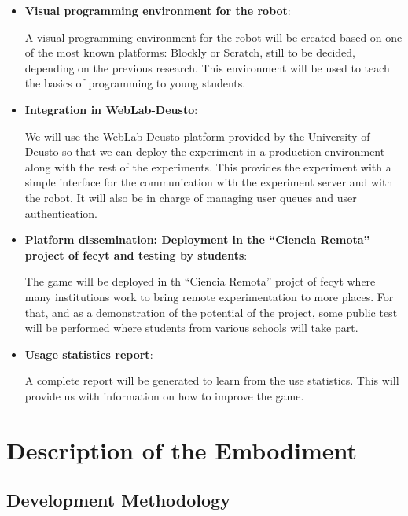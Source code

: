 \begin{itemize}
\item \textbf{Visual programming environment for the robot}:

A visual programming environment for the robot will be created based on one of the most known
platforms: Blockly or Scratch, still to be decided, depending on the previous research. This
environment will be used to teach the basics of programming to young students.

\item \textbf{Integration in WebLab-Deusto}:

We will use the WebLab-Deusto platform provided by the University of Deusto so that we can deploy
the experiment in a production environment along with the rest of the experiments. This provides the
experiment with a simple interface for the communication with the experiment server and with the
robot. It will also be in charge of managing user queues and user authentication.

\item \textbf{Platform dissemination: Deployment in the ``Ciencia Remota'' project of
\acrshort{fecyt} and testing by students}:

The game will be deployed in th ``Ciencia Remota'' projct of \acrshort{fecyt} where many
institutions work to bring remote experimentation to more places. For that, and as a demonstration
of the potential of the project, some public test will be performed where students from various
schools will take part.

\item \textbf{Usage statistics report}:

A complete report will be generated to learn from the use statistics. This will provide us with
information on how to improve the game.

\end{itemize}

\section{Description of the Embodiment}

\subsection{Development Methodology}

